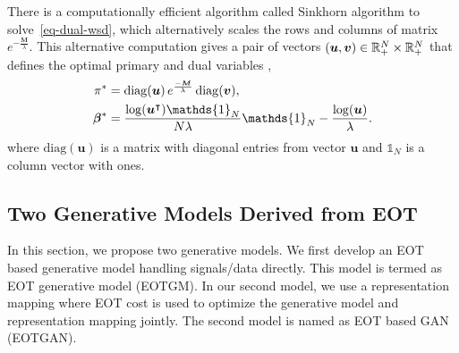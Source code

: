 There is a computationally efficient algorithm called Sinkhorn
algorithm\cite{2013arXiv1306.0895C, 2013arXiv1310.4375C} to
solve~\eqref{eq-dual-wsd}, which alternatively scales the rows and columns of matrix $e^{-\frac{\bm{M}}{\lambda}}$. This alternative computation gives a pair of vectors $(\bm{u}, \bm{v}) \in \mathbb{R}^N_{+} \times \mathbb{R}^N_{+}$ that defines the optimal primary and dual variables \cite[Proposition~2]{2013arXiv1310.4375C},
\begin{align}\label{eq-dual-opt}
  \pi^{\ast} &=
               \mathrm{diag}(\bm{u}) \, e^{\frac{-\bm{M}}{\la}} \, \mathrm{diag}(\bm{v}),  \nonumber \\
  \bm{\beta}^{\ast} &= \frac{\log(\bm{u}^{\intercal})\mathds{1}_N}{N\la} \mathds{1}_N -\frac{\log(\bm{u})}{\la}.
\end{align}
where $\mathrm{diag}(\bm{u})$ is a matrix with diagonal entries from vector $\bm{u}$ and $\mathds{1}_N$ is a column vector with ones.


\subsection{Two Generative Models Derived from EOT}

In this section, we propose two generative models.
We first develop an EOT based generative model handling signals/data directly. This model is termed as EOT generative model (EOTGM). 
In our second model, we use a
representation mapping where EOT cost is used to optimize the
generative model and representation mapping jointly. The second model is named as EOT based GAN (EOTGAN).

